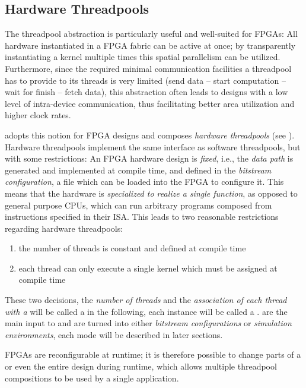 \subsection*{Hardware Threadpools}
The threadpool abstraction is particularly useful and well-suited for FPGAs:
All hardware instantiated in a FPGA fabric can be active at once; by transparently instantiating a kernel multiple times this spatial parallelism can be utilized.
Furthermore, since the required minimal communication facilities a threadpool has to provide to its threads is very limited (send data -- start computation -- wait for finish -- fetch data), this abstraction often leads to designs with a low level of intra-device communication, thus facilitating better area utilization and higher clock rates.

\medskip
\tapasco{} adopts this notion for FPGA designs and composes \emph{hardware threadpools} (see ).
Hardware threadpools implement the same interface as software threadpools, but with some restrictions:
An FPGA hardware design is \emph{fixed}, i.e., the \emph{data path} is generated and implemented at compile time, and defined in the \emph{bitstream configuration}, a file which can be loaded into the FPGA to configure it.
This means that the hardware is \emph{specialized to realize a single function}, as opposed to general purpose CPUs, which can run arbitrary programs composed from instructions specified in their ISA.
This leads to two reasonable restrictions regarding hardware threadpools:

\begin{enumerate}
  \item the number of threads is constant and defined at compile time
  \item each thread can only execute a single kernel which must be assigned at compile time
\end{enumerate}

These two decisions, the \emph{number of threads} and the \emph{association of each thread with a } will be called a  in the following, each  instance will be called a .
 are the main input to \tapasco{} and are turned into either \emph{bitstream configurations} or \emph{simulation environments}, each mode will be described in later sections.

\medskip
\begin{note}
FPGAs are reconfigurable at runtime; it is therefore possible to change parts of a or even the entire design during runtime, which allows multiple threadpool compositions to be used by a single application.
\end{note}

